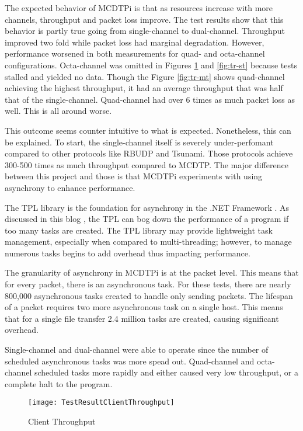 The expected behavior of MCDTPi is that as resources increase with more channels, throughput and packet loss improve. The test results show that this behavior is partly true going from single-channel to dual-channel. Throughput improved two fold while packet loss had marginal degradation. However, performance worsened in both measurements for quad- and octa-channel configurations. Octa-channel was omitted in Figures \ref{fig:tr-ct} and \ref{fig:tr-st} because tests stalled and yielded no data. Though the Figure \ref{fig:tr-mt} shows quad-channel achieving the highest throughput, it had an average throughput that was half that of the single-channel. Quad-channel had over 6 times as much packet loss as well. This is all around worse.

This outcome seems counter intuitive to what is expected. Nonetheless, this can be explained. To start, the single-channel itself is severely under-perfomant compared to other protocols like RBUDP and Tsunami. Those protocols achieve 300-500 times as much throughput compared to MCDTP. The major difference between this project and those is that MCDTPi experiments with using asynchrony to enhance performance.

The TPL library is the foundation for asynchrony in the .NET Framework \cite{Leijen2009}. As discussed in this blog \cite{Lippert}, the TPL can bog down the performance of a program if too many tasks are created. The TPL library may provide lightweight task management, especially when compared to multi-threading; however, to manage numerous tasks begins to add overhead thus impacting performance.

The granularity of asynchrony in MCDTPi is at the packet level. This means that for every packet, there is an asynchronous task. For these tests, there are nearly 800,000 asynchronous tasks created to handle only sending packets. The lifespan of a packet requires two more asynchronous task on a single host. This means that for a single file transfer 2.4 million tasks are created, causing significant overhead.

Single-channel and dual-channel were able to operate since the number of scheduled asynchronous tasks was more spead out. Quad-channel and octa-channel scheduled tasks more rapidly and either caused very low throughput, or a complete halt to the program.

\newpage

\begin{figure}[ht]
\centering
\texttt{[image: TestResultClientThroughput]}
\caption{Client Throughput}
\label{fig:tr-ct}
\end{figure}

